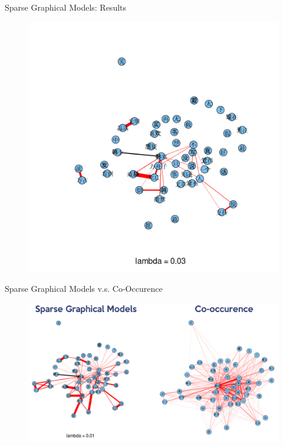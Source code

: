 \documentclass[12pt]{beamer}
\newcommand{\1}[1]{{\mathbf 1}\left\{#1\right\}}        %
\begin{document}
\begin{frame}{Sparse Graphical Models: Results}

\begin{figure}
  \centering
  \includegraphics[height=0.9\textheight]{./../../gLassoResults/glasso6.png} 
\end{figure}

\end{frame}

\begin{frame}{Sparse Graphical Models v.s. Co-Occurence}

\begin{figure}
  \centering
  \includegraphics[scale=0.35]{sgmVScooc.pdf} 
\end{figure}

\end{frame}
\end{document}

